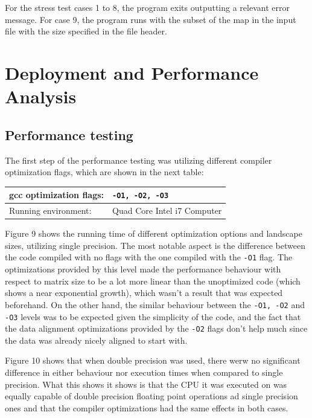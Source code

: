 \documentclass[12pt,a4paper]{article}
\begin{document}
For the stress test cases 1 to 8, the program exits outputting a relevant error message. For case 9, the program runs with the subset of the map in the input file with the size specified in the file header.

\section{Deployment and Performance Analysis}

\subsection{Performance testing} 


The first step of the performance testing was utilizing different compiler optimization flags, which are shown in the next table:

\begin{tabular}{ | l || l | }
    \hline
    gcc optimization flags:  & \texttt{-O1, -O2, -O3} \\
    \hline
    Running environment:  & Quad Core Intel i7 Computer \\
    \hline
\end{tabular}

Figure 9 shows the running time of different optimization options and landscape sizes, utilizing single precision. The most notable aspect is the difference between the code compiled with no flags with the one compiled with the \texttt{-O1} flag. The optimizations provided by this level made the performance behaviour with respect to matrix size to be a lot more linear than the unoptimized code (which shows a near exponential growth), which wasn't a result that was expected beforehand. On the other hand, the similar behaviour between the  \texttt{-O1, -O2} and  \texttt{-O3} levels was to be expected given the simplicity of the code, and the fact that the data alignment optimizations provided by the \texttt{-O2} flags don't help much since the data was already nicely aligned to start with.

Figure 10 shows that when double precision was used, there werw no significant difference in either behaviour nor execution times when compared to single precision. What this shows it shows is that the CPU it was executed on was equally capable of double precision floating point operations ad single precision ones and that the compiler optimizations had the same effects in both cases.
\end{document}
